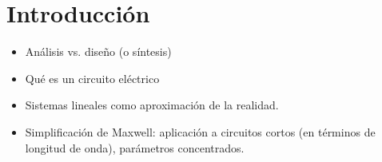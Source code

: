 \chapter{Introducción}
\label{cha:intro}

\begin{itemize}
\item Análisis vs. diseño (o síntesis)
\item Qué es un circuito eléctrico
\item Sistemas lineales como aproximación de la realidad.
\item Simplificación de Maxwell: aplicación a circuitos cortos (en términos de longitud de onda), parámetros concentrados.
\end{itemize}

